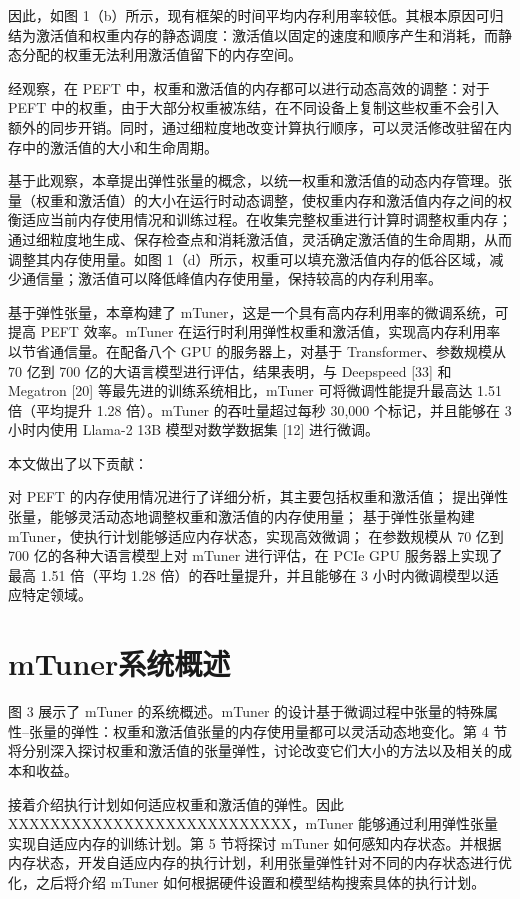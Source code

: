 因此，如图 1（b）所示，现有框架的时间平均内存利用率较低。其根本原因可归结为激活值和权重内存的静态调度：激活值以固定的速度和顺序产生和消耗，而静态分配的权重无法利用激活值留下的内存空间。

经观察，在 PEFT 中，权重和激活值的内存都可以进行动态高效的调整：对于 PEFT 中的权重，由于大部分权重被冻结，在不同设备上复制这些权重不会引入额外的同步开销。同时，通过细粒度地改变计算执行顺序，可以灵活修改驻留在内存中的激活值的大小和生命周期。

基于此观察，本章提出弹性张量的概念，以统一权重和激活值的动态内存管理。张量（权重和激活值）的大小在运行时动态调整，使权重内存和激活值内存之间的权衡适应当前内存使用情况和训练过程。在收集完整权重进行计算时调整权重内存；通过细粒度地生成、保存检查点和消耗激活值，灵活确定激活值的生命周期，从而调整其内存使用量。如图 1（d）所示，权重可以填充激活值内存的低谷区域，减少通信量；激活值可以降低峰值内存使用量，保持较高的内存利用率。

基于弹性张量，本章构建了 mTuner，这是一个具有高内存利用率的微调系统，可提高 PEFT 效率。mTuner 在运行时利用弹性权重和激活值，实现高内存利用率以节省通信量。在配备八个 GPU 的服务器上，对基于 Transformer、参数规模从 70 亿到 700 亿的大语言模型进行评估，结果表明，与 Deepspeed [33] 和 Megatron [20] 等最先进的训练系统相比，mTuner 可将微调性能提升最高达 1.51 倍（平均提升 1.28 倍）。mTuner 的吞吐量超过每秒 30,000 个标记，并且能够在 3 小时内使用 Llama-2 13B 模型对数学数据集 [12] 进行微调。

本文做出了以下贡献：

对 PEFT 的内存使用情况进行了详细分析，其主要包括权重和激活值；
提出弹性张量，能够灵活动态地调整权重和激活值的内存使用量；
基于弹性张量构建 mTuner，使执行计划能够适应内存状态，实现高效微调；
在参数规模从 70 亿到 700 亿的各种大语言模型上对 mTuner 进行评估，在 PCIe GPU 服务器上实现了最高 1.51 倍（平均 1.28 倍）的吞吐量提升，并且能够在 3 小时内微调模型以适应特定领域。

\section{mTuner系统概述}
图 3 展示了 mTuner 的系统概述。mTuner 的设计基于微调过程中张量的特殊属性--张量的弹性：权重和激活值张量的内存使用量都可以灵活动态地变化。第 4 节将分别深入探讨权重和激活值的张量弹性，讨论改变它们大小的方法以及相关的成本和收益。

接着介绍执行计划如何适应权重和激活值的弹性。因此XXXXXXXXXXXXXXXXXXXXXXXXXXX，mTuner 能够通过利用弹性张量实现自适应内存的训练计划。第 5 节将探讨 mTuner 如何感知内存状态。并根据内存状态，开发自适应内存的执行计划，利用张量弹性针对不同的内存状态进行优化，之后将介绍 mTuner 如何根据硬件设置和模型结构搜索具体的执行计划。


